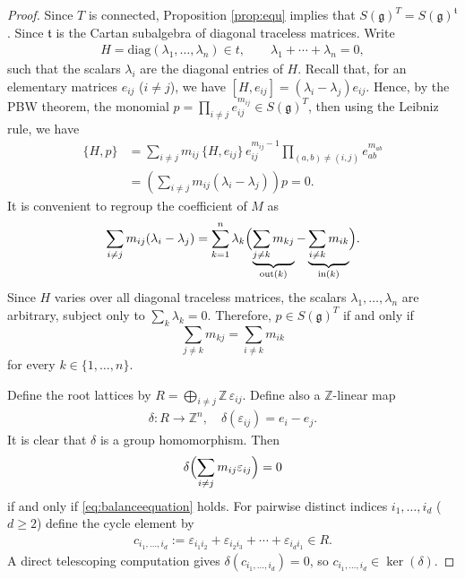 \documentclass[10pt,a4paper]{amsart}
\begin{document}
\begin{proof}
  Since $T$ is connected, Proposition \ref{prop:equ} implies that $S(\mathfrak{g})^T = S(\mathfrak{g})^\mathfrak{t}$. Since $\mathfrak{t}$ is the Cartan subalgebra of diagonal traceless matrices. Write  \begin{align*}
      H=\mathrm{diag}(\lambda_1,\dots,\lambda_n)\in t, \qquad \lambda_1 +\cdots + \lambda_n = 0,
  \end{align*} such that the scalars $\lambda_i$ are the diagonal entries of $H$. Recall that, for an elementary matrices $e_{ij}$ ($i \neq j$), we have $[H,e_{ij}] = (\lambda_i - \lambda_j) e_{ij}$. Hence, by the PBW theorem, the monomial $p = \prod_{ i \neq j} e_{ij}^{m_{ij}} \in S(\mathfrak{g})^T$, then using the Leibniz rule, we have \begin{align*}
      \{H,p\}&=\sum_{i\neq j} m_{ij}\,\{H,e_{ij}\}\,e_{ij}^{m_{ij}-1}\prod_{(a,b)\neq(i,j)} e_{ab}^{m_{ab}}\\
&=\left(\sum_{i\neq j} m_{ij}(\lambda_i-\lambda_j)\right)p = 0.
  \end{align*} It is convenient to regroup the coefficient of $M$ as
\begin{align*}
\sum_{i\neq j} m_{ij}(\lambda_i-\lambda_j)
=\sum_{k=1}^n \lambda_k\Bigl(\underbrace{\sum_{j\neq k} m_{kj}}_{\text{out}(k)}-\underbrace{\sum_{i\neq k} m_{ik}}_{\text{in}(k)}\Bigr).
\end{align*}
Since $H$ varies over all diagonal traceless matrices, the scalars $\lambda_1,\dots,\lambda_n$ are arbitrary, subject only to $\sum_k\lambda_k =0$. Therefore, $p\in S(\mathfrak{g})^T$ if and only if  \begin{equation}
    \sum_{j\neq k}m_{kj}=\sum_{i\neq k}m_{ik} \label{eq:balanceequation}
\end{equation}   for every $k\in\{1,\dots,n\}$.

Define the root lattices by $R = \bigoplus_{i\neq j}\mathbb{Z}\,\varepsilon_{ij}$. Define also a $\mathbb{Z}$-linear map \begin{align*}
    \delta: R \rightarrow \mathbb{Z}^n, \quad \delta(\varepsilon_{ij}) = e_i  - e_j.
\end{align*} It is clear that $\delta$ is a group homomorphism.  Then \begin{align*}
\delta\Bigl(\sum_{i\neq j} m_{ij} \varepsilon_{ij}\Bigr) = 0
\end{align*} if and only if \eqref{eq:balanceequation} holds. For pairwise distinct indices $i_1,\dots,i_d$ ($d \geq 2$) define the cycle element by \begin{align*}
c_{i_1,\dots,i_d} := \varepsilon_{i_1 i_2} + \varepsilon_{i_2 i_3}+ \cdots+\varepsilon_{i_d i_1}\in R.
\end{align*} A direct telescoping computation gives $\delta(c_{i_1,\dots,i_d}) = 0$, so $c_{i_1,\dots,i_d}\in\ker(\delta)$.


\end{proof}
\end{document}
